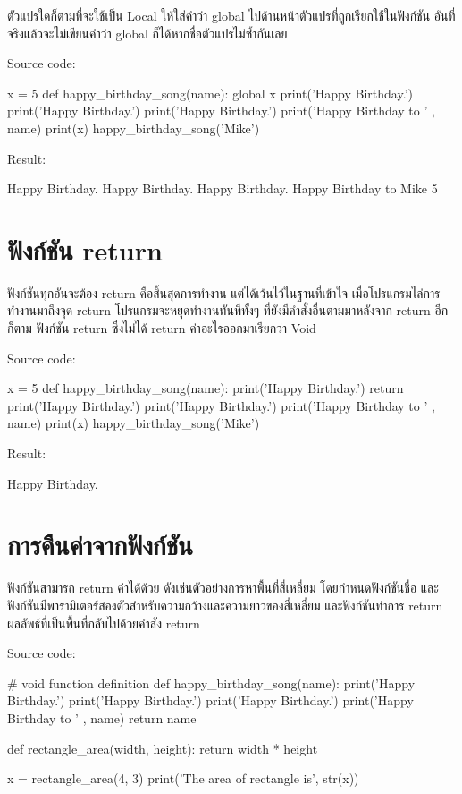 ตัวแปรใดก็ตามที่จะใช้เป็น Local ให้ใส่คำว่า global ไปด้านหน้าตัวแปรที่ถูกเรียกใช้ในฟังก์ชัน อันที่จริงแล้วจะไม่เขียนคำว่า global ก็ได้หากชื่อตัวแปรไม่ซ้ำกันเลย

Source code:
\begin{pycode}
x = 5
def happy_birthday_song(name):
    global x
    print('Happy Birthday.')
    print('Happy Birthday.')
    print('Happy Birthday.')
    print('Happy Birthday to ' , name)
    print(x)
happy_birthday_song('Mike')
\end{pycode}

Result:
\begin{pycode}
Happy Birthday.
Happy Birthday.
Happy Birthday.
Happy Birthday to Mike
5
\end{pycode}

\section{ฟังก์ชัน return}

ฟังก์ชันทุกอันจะต้อง return คือสิ้นสุดการทำงาน แต่ได้เว้นไว้ในฐานที่เข้าใจ เมื่อโปรแกรมไล่การทำงานมาถึงจุด return โปรแกรมจะหยุดทำงานทันทีทั้งๆ ที่ยังมีคำสั่งอื่นตามมาหลังจาก return อีกก็ตาม  ฟังก์ชัน return ซึ่งไม่ได้ return ค่าอะไรออกมาเรียกว่า Void 

Source code:
\begin{pycode}
x = 5
def happy_birthday_song(name):
    print('Happy Birthday.')
    return
    print('Happy Birthday.')
    print('Happy Birthday.')
    print('Happy Birthday to ' , name)
    print(x)
happy_birthday_song('Mike')
\end{pycode}

Result:
\begin{pycode}
Happy Birthday.
\end{pycode}

\section{การคืนค่าจากฟังก์ชัน}

ฟังก์ชันสามารถ return ค่าได้ด้วย ดังเช่นตัวอย่างการหาพื้นที่สี่เหลี่ยม โดยกำหนดฟังก์ชันชื่อ   และฟังก์ชันมีพารามิเตอร์สองตัวสำหรับความกว้างและความยาวของสี่เหลี่ยม และฟังก์ชันทำการ return ผลลัพธ์ที่เป็นพื้นที่กลับไปด้วยคำสั่ง return

Source code:
\begin{pycode}
# void function definition
def happy_birthday_song(name):
    print('Happy Birthday.')
    print('Happy Birthday.')
    print('Happy Birthday.')
    print('Happy Birthday to ' , name)
    return name

def rectangle_area(width, height):
    return width * height
    
x = rectangle_area(4, 3)
print('The area of rectangle is', str(x))
\end{pycode}

